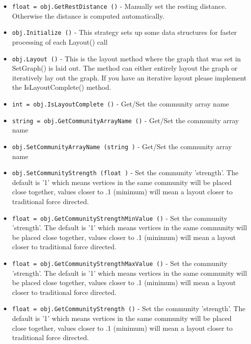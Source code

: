 \begin{itemize}
\item  \verb|float = obj.GetRestDistance ()| -  Manually set the resting distance. Otherwise the
 distance is computed automatically.

\item  \verb|obj.Initialize ()| -  This strategy sets up some data structures
 for faster processing of each Layout() call

\item  \verb|obj.Layout ()| -  This is the layout method where the graph that was
 set in SetGraph() is laid out. The method can either
 entirely layout the graph or iteratively lay out the
 graph. If you have an iterative layout please implement
 the IsLayoutComplete() method.

\item  \verb|int = obj.IsLayoutComplete ()| -  Get/Set the community array name

\item  \verb|string = obj.GetCommunityArrayName ()| -  Get/Set the community array name

\item  \verb|obj.SetCommunityArrayName (string )| -  Get/Set the community array name

\item  \verb|obj.SetCommunityStrength (float )| -  Set the community 'strength'.  The default is '1'
 which means vertices in the same community will be
 placed close together, values closer to .1 (minimum)
 will mean a layout closer to traditional force directed.

\item  \verb|float = obj.GetCommunityStrengthMinValue ()| -  Set the community 'strength'.  The default is '1'
 which means vertices in the same community will be
 placed close together, values closer to .1 (minimum)
 will mean a layout closer to traditional force directed.

\item  \verb|float = obj.GetCommunityStrengthMaxValue ()| -  Set the community 'strength'.  The default is '1'
 which means vertices in the same community will be
 placed close together, values closer to .1 (minimum)
 will mean a layout closer to traditional force directed.

\item  \verb|float = obj.GetCommunityStrength ()| -  Set the community 'strength'.  The default is '1'
 which means vertices in the same community will be
 placed close together, values closer to .1 (minimum)
 will mean a layout closer to traditional force directed.

\end{itemize}
